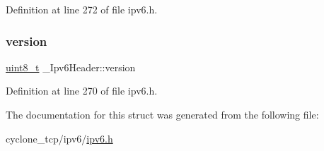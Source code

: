 Definition at line 272 of file ipv6.\+h.

\mbox{\label{struct__Ipv6Header_a19faa8b7188c15c19505913395c55de5}} 
\subsubsection{\texorpdfstring{version}{version}}
{\footnotesize\ttfamily \hyperlink{stdint_8h_aba7bc1797add20fe3efdf37ced1182c5}{uint8\+\_\+t} \+\_\+\+Ipv6\+Header\+::version}



Definition at line 270 of file ipv6.\+h.



The documentation for this struct was generated from the following file\+:\begin{DoxyCompactItemize}
\item 
cyclone\+\_\+tcp/ipv6/\hyperlink{ipv6_8h}{ipv6.\+h}\end{DoxyCompactItemize}
